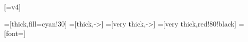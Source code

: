\usepackage[lf]{carlito}
\usepackage{siunitx}
\usepackage[siunitx]{circuitikz}
\usepackage{tikz}
\usepackage{mathpazo}
\usepackage{bm}
\usepackage{mathtools}
\usepackage[ISO]{diffcoeff}[=v4]
\usepackage{xcolor,colortbl}

\setlength{\parskip}{0pt}
\renewcommand{\baselinestretch}{1}


\tikzset{
  >=latex,
  voltage dir=RP,
}
=[thick,fill=cyan!30]
=[thick,->]
=[very thick,->]
=[very thick,red!80!black]
=[font=\footnotesize]
